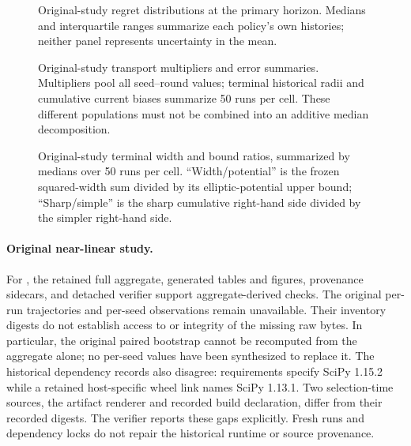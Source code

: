 \begin{figure}[p]
  \centering
  
  \caption{Original-study regret distributions at the primary horizon.
  Medians and interquartile ranges summarize each policy's own histories;
  neither panel represents uncertainty in the mean.}
  \label{fig:transport-original-distribution}
\end{figure}

\begin{figure}[p]
  \centering
  
  \caption{Original-study transport multipliers and error summaries.
  Multipliers pool all seed--round values; terminal historical radii and
  cumulative current biases summarize 50 runs per cell. These different
  populations must not be combined into an additive median decomposition.}
  \label{fig:transport-original-components}
\end{figure}

\begin{figure}[p]
  \centering
  
  \caption{Original-study terminal width and bound ratios, summarized by
  medians over 50 runs per cell. ``Width/potential'' is the frozen squared-width
  sum divided by its elliptic-potential upper bound; ``Sharp/simple'' is the
  sharp cumulative right-hand side divided by the simpler right-hand side.}
  \label{fig:transport-original-bound-ratios}
\end{figure}

%
\paragraph{Original near-linear study.}
For , the retained full aggregate, generated
tables and figures, provenance sidecars, and detached verifier support
aggregate-derived checks. The original per-run trajectories and per-seed
observations remain unavailable. Their inventory digests do not establish
access to or integrity of the missing raw bytes. In particular, the original
paired bootstrap cannot be recomputed from the aggregate alone; no per-seed
values have been synthesized to replace it. The historical dependency records
also disagree: requirements specify SciPy 1.15.2 while a retained host-specific
wheel link names SciPy 1.13.1. Two selection-time sources, the artifact renderer
and recorded build declaration, differ from their recorded digests. The verifier
reports these gaps explicitly. Fresh runs and dependency locks do not repair
the historical runtime or source provenance.
